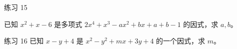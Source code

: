 
\begin{problem}{练习 15}

已知 $x^2+x-6$ 是多项式 $2x^4+x^3-ax^2+bx+a+b-1$ 的因式，求 $a,b$。

\end{problem}

\begin{problem}{练习 16}
已知 $x-y+4$ 是 $x^2-y^2+mx+3y+4$ 的一个因式，求 $m$。
\end{problem}
